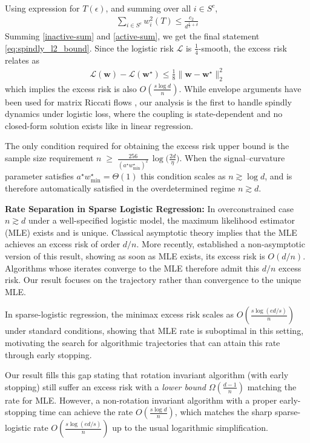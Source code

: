 \documentclass{article}
\theoremstyle{plain}
\theoremstyle{definition}
\theoremstyle{remark}
\begin{document}
Using expression for $T(\epsilon)$, and summing over all $i\in S^{c}$,  
\begin{align}
\label{inactive-sum}
    \sum_{i\in S^{c}}w^{2}_i(T) \leq \frac{c_{2}}{d^{\frac{1}{2}+\delta}}
\end{align}
Summing \eqref{inactive-sum} and \eqref{active-sum}, we get the final statement \eqref{eq:spindly_l2_bound}. Since the logistic risk $\mathcal{L}$ is $\frac{1}{4}$-smooth, the excess risk relates as
\begin{align*}
    \mathcal{L}(\mathbf{w}) - \mathcal{L}(\mathbf{w}^{\star}) \leq \frac{1}{8} \| \mathbf{w} - \mathbf{w}^{\star} \|^{2}_{2}
\end{align*}
which implies the excess risk is also $O(\frac{s \log d}{n})$. 
While envelope arguments have been used for matrix Riccati flows \cite{arous2025learning}, our analysis is the first to handle spindly dynamics under logistic loss, where the coupling is state-dependent and no closed-form solution exists like in linear regression.

The only condition required for obtaining the excess risk upper bound is the sample size requirement $n \;\ge\; \frac{256}{(a^\star w_{\min}^\star)^2}\,
\log\!\Big(\frac{2d}{\eta}\Big).$ When the signal--curvature parameter satisfies $a^\star w_{\min}^\star = \Theta(1)$ this condition scales as \(n \gtrsim \log d\), and is therefore automatically satisfied in the overdetermined regime \(n \gtrsim d\).


\textbf{Rate Separation in Sparse Logistic Regression:} In overconstrained case $n \gtrsim d$ under a well-specified logistic model, the maximum likelihood estimator (MLE) exists and is unique. Classical asymptotic theory \cite{van2000asymptotic} implies that the MLE achieves an excess risk of order $d/n$. More recently, \citet{chardon2024finite} established a non-asymptotic version of this result, showing as soon as MLE exists, its excess risk is $O(d/n)$. Algorithms whose iterates converge to the MLE therefore admit this $d/n$ excess risk. Our result focuses on the trajectory rather than convergence to the unique MLE. 

In sparse-logistic regression, the minimax excess risk scales as $O(\frac{s \log (ed/s)}{n})$ under standard conditions, showing that MLE rate is suboptimal in this setting, motivating the search for algorithmic trajectories that can attain this rate through early stopping. 

Our result fills this gap stating that rotation invariant algorithm (with early stopping) still suffer an excess risk with a \textit{lower bound} $\Omega(\frac{d-1}{n})$ matching the rate for MLE. However, a non-rotation invariant algorithm with a proper early-stopping time can achieve the  rate $O(\frac{s \log d}{n})$, which matches the sharp sparse-logistic rate $O(\frac{s \log (ed/s)}{n})$ up to the usual logarithmic simplification. 
\end{document}
